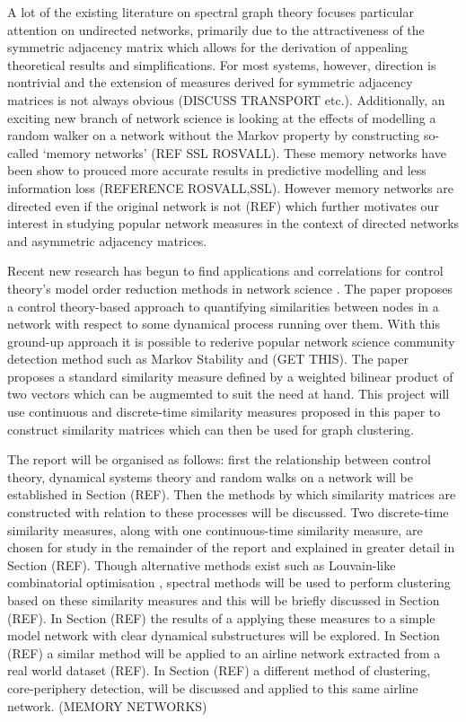 \documentclass[12pt,a4paper]{article}
\begin{document}
\noindent A lot of the existing literature on spectral graph theory focuses particular attention on undirected networks, primarily due to the attractiveness of the symmetric adjacency matrix which allows for the derivation of appealing theoretical results and simplifications. For most systems, however, direction is nontrivial and the extension of measures derived for symmetric adjacency matrices is not always obvious (DISCUSS TRANSPORT etc.). Additionally, an exciting new branch of network science is looking at the effects of modelling a random walker on a network without the Markov property by constructing so-called `memory networks' (REF SSL ROSVALL). These memory networks have been show to prouced more accurate results in predictive modelling and less information loss (REFERENCE ROSVALL,SSL). However memory networks are directed even if the original network is not (REF) which further motivates our interest in studying popular network measures in the context of directed networks and asymmetric adjacency matrices. \medskip

\noindent Recent new research has begun to find applications and correlations for control theory's model order reduction methods in network science \cite{schaub2017many}. The paper \cite{schaub2019multiscale} proposes a control theory-based approach to quantifying similarities between nodes in a network with respect to some dynamical process running over them. With this ground-up approach it is possible to rederive popular network science community detection method such as Markov Stability and (GET THIS). The paper proposes a standard similarity measure defined by a weighted bilinear product of two vectors which can be augmemted to suit the need at hand. This project will use continuous and discrete-time similarity measures proposed in this paper to construct similarity matrices which can then be used for graph clustering. \medskip


\noindent The report will be organised as follows: first the relationship between control theory, dynamical systems theory and random walks on a network will be established in Section (REF). Then the methods by which similarity matrices are constructed with relation to these processes will be discussed. Two discrete-time similarity measures, along with one continuous-time similarity measure, are chosen for study in the remainder of the report and explained in greater detail in Section (REF). Though alternative methods exist such as Louvain-like combinatorial optimisation \cite{schaub2019multiscale}, spectral methods will be used to perform clustering based on these similarity measures and this will be briefly discussed in Section (REF). In Section (REF) the results of a applying these measures to a simple model network with clear dynamical substructures will be explored. In Section (REF) a similar method will be applied to an airline network extracted from a real world dataset (REF). In Section (REF) a different method of clustering, core-periphery detection, will be discussed and applied to this same airline network. (MEMORY NETWORKS)
\end{document}

